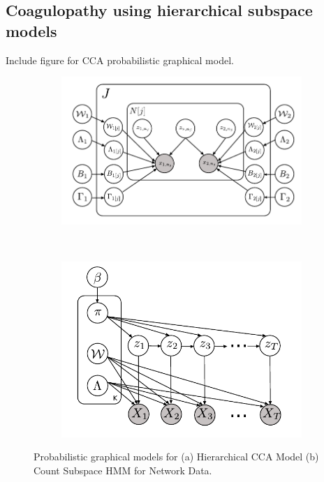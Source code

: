 \documentclass{article}
\begin{document}
\subsection{Coagulopathy using hierarchical subspace models}
Include figure for CCA probabilistic graphical model.

\begin{figure}
    \centering
    \begin{subfigure}[b]{0.45\textwidth}
        \includegraphics[width=\textwidth]{CCA.pdf}
        \caption{}
        \label{fig:CCA}
    \end{subfigure}
    ~ %
    \begin{subfigure}[b]{0.45\textwidth}
        \includegraphics[width=\textwidth]{HMM.pdf}
        \caption{}
        \label{fig:HMM}
    \end{subfigure}
    \caption{Probabilistic graphical models for (a) Hierarchical CCA Model (b) Count Subspace HMM for Network Data.}\label{fig:ccaResults}
\end{figure}
\end{document}
